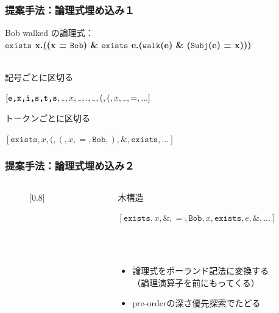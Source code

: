 \documentclass[dvipdfmx,cjk]{beamer}
\newcommand{\LF}[1]{\ensuremath{\texttt{#1}}}
\newcommand\vartextvisiblespace[1][.5em]{%
  \makebox[#1]{%
    \kern.07em
    \vrule height.3ex
    \hrulefill
    \vrule height.3ex
    \kern.07em
  }%
}
\begin{document}
\begin{frame}
\frametitle{提案手法：論理式埋め込み１}
Bob walked の論理式：\\
\textbf{
  \LF{exists} x.((x = \LF{Bob}) \& \LF{exists} e.(\LF{walk}(e) \& (\LF{Subj}(e) = x)))
}
\\~\
\begin{block}{記号ごとに区切る}
\begin{center}
$[\LF{e,x,i,s,t,s}, {\tt \vartextvisiblespace}, x,{\tt \vartextvisiblespace},.,{\tt \vartextvisiblespace},(,(,x,{\tt \vartextvisiblespace},=,...]$
\end{center}
\end{block}
\begin{block}{トークンごとに区切る}
\begin{center}
  $[\LF{exists},x,(,(,x,=,\LF{Bob},),\&,\LF{exists},...]$
\end{center}
\end{block}
\end{frame}


\begin{frame}
\frametitle{提案手法：論理式埋め込み２}
\begin{columns}[t]
    \begin{column}{0.4\textwidth} %
        \begin{figure}[h]
        \begin{center}
          \scalebox{}[0.8]{
          }
        \end{center}
        \end{figure}
    \end{column}
    \begin{column}{0.6\textwidth} %
      \begin{block}{木構造}
        \begin{center}
          $[\LF{exists},x,\&,=,\LF{Bob},x,\LF{exists},e,\&,...]$
        \end{center}
      \end{block}
      \\~\
      \begin{itemize}
        \item 論理式をポーランド記法に変換する\\（論理演算子を前にもってくる）
        \item pre-orderの深さ優先探索でたどる
      \end{itemize}
    \end{column}
\end{columns}

\end{frame}
\end{document}
